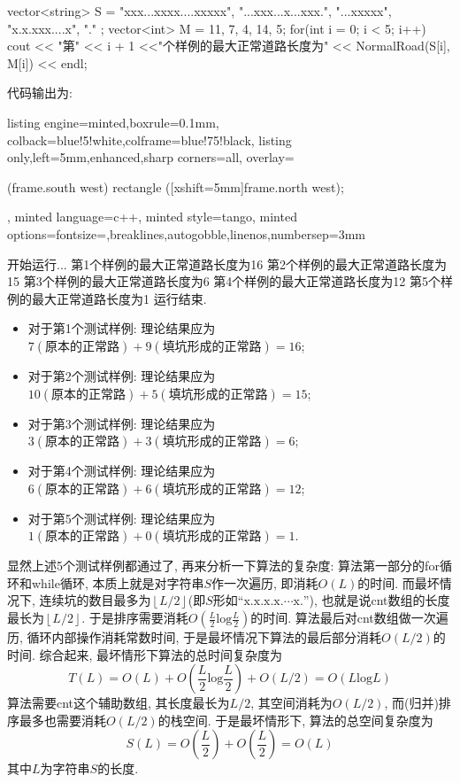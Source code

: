 \documentclass{article}
\begin{document}
\begin{homeworkProblem}
\begin{tcblisting}
{    vector<string> S = {
        "xxx...xxxx....xxxxx", "...xxx...x...xxx.", "...xxxxx", "x.x.xxx....x", "."
    };
    vector<int> M = {11, 7, 4, 14, 5};
    for(int i = 0; i < 5; i++) {
        cout << "第" << i + 1 <<"个样例的最大正常道路长度为" << NormalRoad(S[i], M[i]) << endl;
    }
}
\end{tcblisting}
    代码输出为:
\begin{tcblisting}{listing engine=minted,boxrule=0.1mm,
colback=blue!5!white,colframe=blue!75!black,
listing only,left=5mm,enhanced,sharp corners=all,
overlay={\begin{tcbclipinterior} (frame.south west)
rectangle ([xshift=5mm]frame.north west);\end{tcbclipinterior}},
minted language=c++,
minted style=tango,
minted options={fontsize=\small,breaklines,autogobble,linenos,numbersep=3mm}}
开始运行...
第1个样例的最大正常道路长度为16
第2个样例的最大正常道路长度为15
第3个样例的最大正常道路长度为6
第4个样例的最大正常道路长度为12
第5个样例的最大正常道路长度为1
运行结束.
\end{tcblisting}
    \begin{itemize}
        \item 对于第1个测试样例: 理论结果应为$7(\text{原本的正常路})+9(\text{填坑形成的正常路})=16$;
        \item 对于第2个测试样例: 理论结果应为$10(\text{原本的正常路})+5(\text{填坑形成的正常路})=15$;
        \item 对于第3个测试样例: 理论结果应为$3(\text{原本的正常路})+3(\text{填坑形成的正常路})=6$;
        \item 对于第4个测试样例: 理论结果应为$6(\text{原本的正常路})+6(\text{填坑形成的正常路})=12$;
        \item 对于第5个测试样例: 理论结果应为$1(\text{原本的正常路})+0(\text{填坑形成的正常路})=1$.
    \end{itemize}

    显然上述5个测试样例都通过了, 再来分析一下算法的复杂度: 算法第一部分的for循环和while循环, 本质上就是对字符串$S$作一次遍历, 即消耗$O(L)$的时间. 而最坏情况下, 连续坑的数目最多为$\left\lfloor L/2\right\rfloor $(即$S$形如“$\text{x}.\text{x}.\text{x}.\text{x}.\cdots \text{x}.$”), 也就是说cnt数组的长度最长为$\left\lfloor L/2\right\rfloor $. 于是排序需要消耗$\displaystyle O\left( \frac{L}{2}\text{log} \frac{L}{2} \right) $的时间. 算法最后对cnt数组做一次遍历, 循环内部操作消耗常数时间, 于是最坏情况下算法的最后部分消耗$O\left(L/2 \right)$的时间. 综合起来, 最坏情形下算法的总时间复杂度为$$T\left( L \right) =O\left( L \right) +O\left( \frac{L}{2}\text{log} \frac{L}{2} \right) +O\left( L/2 \right) =O\left( L\text{log} L \right) 
    $$
    算法需要cnt这个辅助数组, 其长度最长为$L/2$, 其空间消耗为$O(L/2)$, 而(归并)排序最多也需要消耗$O(L/2)$的栈空间. 于是最坏情形下, 算法的总空间复杂度为$$S\left( L \right) =O\left( \frac{L}{2} \right) +O\left( \frac{L}{2} \right) =O\left( L \right) 
    $$
    其中$L$为字符串$S$的长度.
\end{homeworkProblem}
\end{document}
